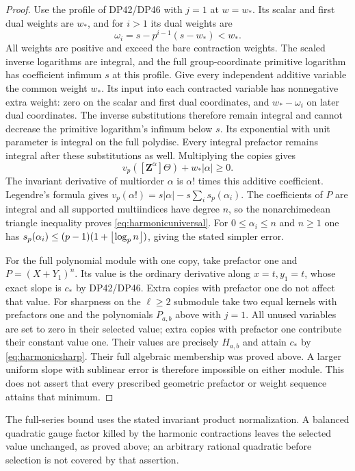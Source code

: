 \documentclass[11pt,a4paper]{article}
\theoremstyle{definition}\newtheorem{remark}[theorem]{Remark}
\newcommand{\vp}{v_p}\newcommand{\dR}{\mathrm{dR}}\newcommand{\crys}{\mathrm{crys}}
\begin{document}
\begin{proof}
Use the profile of DP42/DP46 with $j=1$ at $w=w_*$.
Its scalar and first dual weights are $w_*$, and for $i>1$ its dual weights are
\[
 \omega_i=s-p^{i-1}(s-w_*)<w_*.
\]
All weights are positive and exceed the bare contraction weights.
The scaled inverse logarithms are integral, and the full group-coordinate primitive logarithm has coefficient infimum $s$ at this profile.
Give every independent additive variable the common weight $w_*$.
Its input into each contracted variable has nonnegative extra weight: zero on the scalar and first dual coordinates, and $w_*-\omega_i$ on later dual coordinates.
The inverse substitutions therefore remain integral and cannot decrease the primitive logarithm's infimum below $s$.
Its exponential with unit parameter is integral on the full polydisc.
Every integral prefactor remains integral after these substitutions as well.
Multiplying the copies gives
\[
 \vp([\mathbf Z^\alpha]\Theta)+w_*|\alpha|\ge0.
\]
The invariant derivative of multiorder $\alpha$ is $\alpha!$ times this additive coefficient.
Legendre's formula gives
$\vp(\alpha!)=s|\alpha|-s\sum_i s_p(\alpha_i)$.
The coefficients of $P$ are integral and all supported multiindices have degree $n$, so the nonarchimedean triangle inequality proves \eqref{eq:harmonicuniversal}.
For $0\le\alpha_i\le n$ and $n\ge1$ one has
$s_p(\alpha_i)\le(p-1)(1+\left\lfloor \log_p n\right\rfloor)$, giving the stated simpler error.

For the full polynomial module with one copy, take prefactor one and $P=(X+Y_1)^n$.
Its value is the ordinary derivative along $x=t,y_1=t$, whose exact slope is $c_*$ by DP42/DP46.
Extra copies with prefactor one do not affect that value.
For sharpness on the $\ell\ge2$  submodule take two equal kernels with prefactors one and the polynomials $P_{a,b}$ above with $j=1$.
All unused variables are set to zero in their selected value; extra copies with prefactor one contribute their constant value one.
Their values are precisely $H_{a,b}$ and attain $c_*$ by \eqref{eq:harmonicsharp}.
Their full algebraic  membership was proved above.
A larger uniform slope with sublinear error is therefore impossible on either module.
This does not assert that every prescribed geometric prefactor or weight sequence attains that minimum.
\end{proof}

The full-series bound uses the stated invariant product normalization.
A balanced quadratic gauge factor killed by the harmonic contractions leaves the selected value unchanged, as proved above; an arbitrary rational quadratic before selection is not covered by that assertion.
\end{document}
